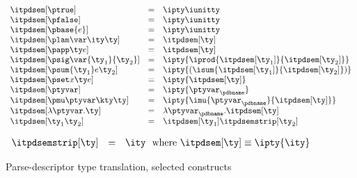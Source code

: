 \begin{figure}
\fbox{$\itpdsem[\ty] = \ity$}
\[ 
\begin{array}{lcl} 
\itpdsem[\ptrue] & = & \ipty \iunitty \\                                                  
\itpdsem[\pfalse] & = & \ipty \iunitty \\                                                  
\itpdsem[\pbase{e}] & = & \ipty \iunitty\\
\itpdsem[\plam \var \ity \ty] & = & \itpdsem[\ty] \\
\itpdsem[\papp \ty e] & = & \itpdsem[\ty] \\
\itpdsem[\psig \var {\ty_1} {\ty_2}] & = & 
               \ipty {\iprod {\itpdsem[\ty_1]} {\itpdsem[\ty_2]}} \\
\itpdsem[\psum {\ty_1} e {\ty_2}] & = & 
               \ipty {(\isum {\itpdsem[\ty_1]} {\itpdsem[\ty_2]})} \\
\itpdsem[\pset x \ty e] & = & \ipty {\itpdsem[\ty]} \\
\itpdsem[\ptyvar] & = & \ipty{\ptyvar_\pdbname} \\
\itpdsem[\pmu \ptyvar \kty \ty] & = & 
  \ipty{\imu{\ptyvar_\pdbname}{\itpdsem[\ty]}} \\
\itpdsem[\lambda \ptyvar.\ty]      
     & = & \lambda \ptyvar_\pdbname.\itpdsem[\ty] \\
\itpdsem[\ty_1 \ty_2]            & = & \itpdsem[\ty_1] \itpdsemstrip[\ty_2] \\
\end{array}
\]

\fbox{$\itpdsemstrip[\ty] = \ity$}

\[
\begin{array}{lcl} 
\itpdsemstrip[\ty] & = & \ity \ \ \mbox{where}\ \itpdsem[\ty] \equiv \ipty{\ity}
\end{array}
\]
\caption{Parse-descriptor type translation, selected constructs}
\label{fig:pd-tys}
\end{figure}

